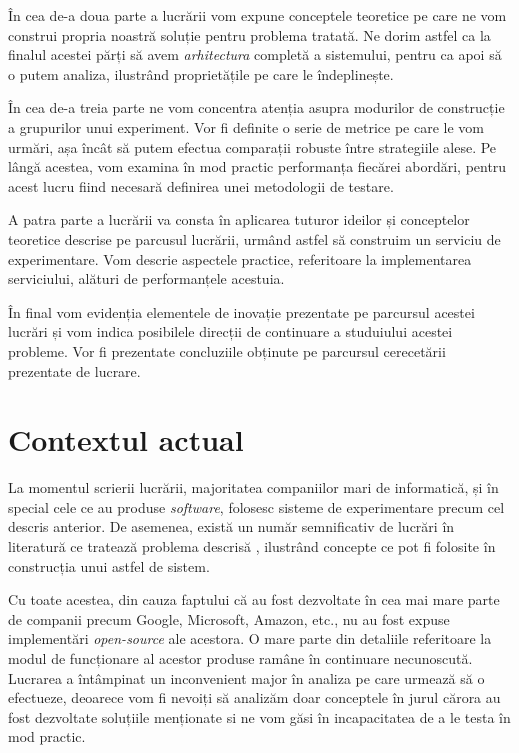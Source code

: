 În cea de-a doua parte a lucrării vom expune conceptele teoretice pe care ne vom construi propria noastră soluție pentru problema tratată. Ne dorim astfel ca la finalul acestei părți să avem \textit{arhitectura} completă a sistemului, pentru ca apoi să o putem analiza, ilustrând proprietățile pe care le îndeplinește.

În cea de-a treia parte ne vom concentra atenția asupra modurilor de construcție a grupurilor unui experiment. Vor fi definite o serie de metrice pe care le vom urmări, așa încât să putem efectua comparații robuste între strategiile alese. Pe lângă acestea, vom examina în mod practic performanța fiecărei abordări, pentru acest lucru fiind necesară definirea unei metodologii de testare.

A patra parte a lucrării va consta în aplicarea tuturor ideilor și conceptelor teoretice descrise pe parcusul lucrării, urmând astfel să construim un serviciu de experimentare. Vom descrie aspectele practice, referitoare la implementarea serviciului, alături de performanțele acestuia.

În final vom evidenția elementele de inovație prezentate pe parcursul acestei lucrări și vom indica posibilele direcții de continuare a studuiului acestei probleme. Vor fi prezentate concluziile obținute pe parcursul cerecetării prezentate de lucrare.

\section{Contextul actual}

La momentul scrierii lucrării, majoritatea companiilor mari de informatică, și în special cele ce au produse \textit{software}, folosesc sisteme de experimentare precum cel descris anterior. De asemenea, există un număr semnificativ de lucrări în literatură ce tratează problema descrisă \cite{overlapgoogle} \cite{multiarmeconomy}, ilustrând concepte ce pot fi folosite în construcția unui astfel de sistem. 

Cu toate acestea, din cauza faptului că au fost dezvoltate în cea mai mare parte de companii precum Google, Microsoft, Amazon, etc., nu au fost expuse implementări \textit{open-source} ale acestora. O mare parte din detaliile referitoare la modul de funcționare al acestor produse ramâne în continuare necunoscută. Lucrarea a întâmpinat un inconvenient major în analiza pe care urmează să o efectueze, deoarece vom fi nevoiți să analizăm doar conceptele în jurul cărora au fost dezvoltate soluțiile menționate si ne vom găsi în incapacitatea de a le testa în mod practic.

